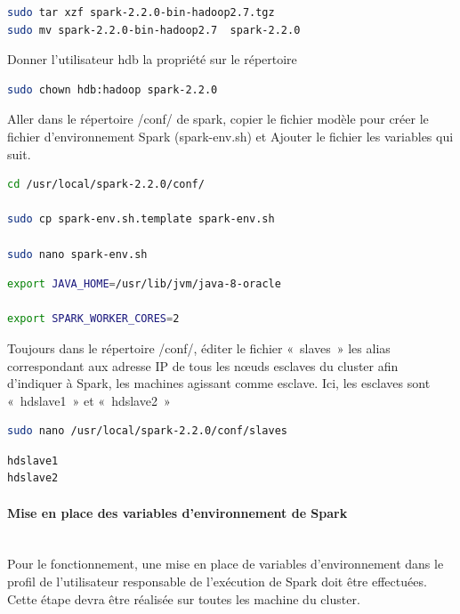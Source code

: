 \documentclass[12pt,french]{book}
\begin{document}
\begin{lstlisting}[language=bash, frame=single]
sudo tar xzf spark-2.2.0-bin-hadoop2.7.tgz 
sudo mv spark-2.2.0-bin-hadoop2.7  spark-2.2.0
\end{lstlisting}

Donner l’utilisateur hdb la propriété sur le répertoire

\begin{lstlisting}[language=bash, frame=single]
sudo chown hdb:hadoop spark-2.2.0
\end{lstlisting}

Aller dans le répertoire /conf/ de spark, copier le fichier modèle pour créer le fichier d’environnement Spark (spark-env.sh) et Ajouter le fichier les variables qui suit.

\begin{lstlisting}[language=bash, frame=single]
cd /usr/local/spark-2.2.0/conf/

sudo cp spark-env.sh.template spark-env.sh

sudo nano spark-env.sh
\end{lstlisting}

\begin{lstlisting}[language=bash, frame=single]
export JAVA_HOME=/usr/lib/jvm/java-8-oracle

export SPARK_WORKER_CORES=2
\end{lstlisting}

Toujours dans le répertoire /conf/, éditer le fichier « slaves » les alias correspondant aux adresse IP de tous les nœuds esclaves du cluster afin d’indiquer à Spark, les machines agissant comme esclave.
Ici, les esclaves sont « hdslave1 » et « hdslave2 »

\begin{lstlisting}[language=bash, frame=single]
sudo nano /usr/local/spark-2.2.0/conf/slaves
\end{lstlisting}

\begin{lstlisting}[language=bash, frame=single]
hdslave1
hdslave2
\end{lstlisting}

\paragraph{Mise en place des variables d’environnement de Spark}\mbox{}\\

Pour le fonctionnement, une mise en place de variables d’environnement dans le profil de l’utilisateur responsable de l’exécution de Spark doit être effectuées.
Cette étape devra être réalisée sur toutes les machine du cluster.
\end{document}
